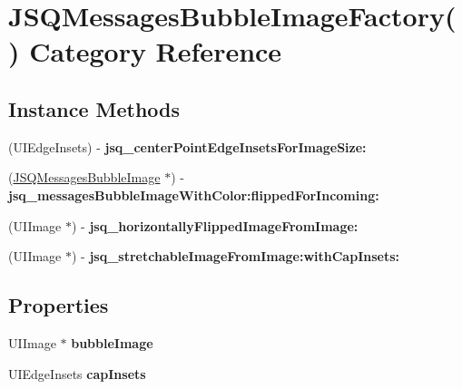 \hypertarget{category_j_s_q_messages_bubble_image_factory_07_08}{}\section{J\+S\+Q\+Messages\+Bubble\+Image\+Factory() Category Reference}
\label{category_j_s_q_messages_bubble_image_factory_07_08}
\subsection*{Instance Methods}
\begin{DoxyCompactItemize}
\item 
\hypertarget{category_j_s_q_messages_bubble_image_factory_07_08_a84f721f2bf179b8a8b4b1c2728c80634}{}(U\+I\+Edge\+Insets) -\/ {\bfseries jsq\+\_\+center\+Point\+Edge\+Insets\+For\+Image\+Size\+:}\label{category_j_s_q_messages_bubble_image_factory_07_08_a84f721f2bf179b8a8b4b1c2728c80634}

\item 
\hypertarget{category_j_s_q_messages_bubble_image_factory_07_08_ab347799d6f7e645a49f43f7ea0d47cd8}{}(\hyperlink{interface_j_s_q_messages_bubble_image}{J\+S\+Q\+Messages\+Bubble\+Image} $\ast$) -\/ {\bfseries jsq\+\_\+messages\+Bubble\+Image\+With\+Color\+:flipped\+For\+Incoming\+:}\label{category_j_s_q_messages_bubble_image_factory_07_08_ab347799d6f7e645a49f43f7ea0d47cd8}

\item 
\hypertarget{category_j_s_q_messages_bubble_image_factory_07_08_a5f48c6255831121009c77402f0458ef0}{}(U\+I\+Image $\ast$) -\/ {\bfseries jsq\+\_\+horizontally\+Flipped\+Image\+From\+Image\+:}\label{category_j_s_q_messages_bubble_image_factory_07_08_a5f48c6255831121009c77402f0458ef0}

\item 
\hypertarget{category_j_s_q_messages_bubble_image_factory_07_08_a86326f60be3d933ee24e94eda5e0eb9f}{}(U\+I\+Image $\ast$) -\/ {\bfseries jsq\+\_\+stretchable\+Image\+From\+Image\+:with\+Cap\+Insets\+:}\label{category_j_s_q_messages_bubble_image_factory_07_08_a86326f60be3d933ee24e94eda5e0eb9f}

\end{DoxyCompactItemize}
\subsection*{Properties}
\begin{DoxyCompactItemize}
\item 
\hypertarget{category_j_s_q_messages_bubble_image_factory_07_08_a5b84c4b987d0a645f9e5b5bee3a8277c}{}U\+I\+Image $\ast$ {\bfseries bubble\+Image}\label{category_j_s_q_messages_bubble_image_factory_07_08_a5b84c4b987d0a645f9e5b5bee3a8277c}

\item 
\hypertarget{category_j_s_q_messages_bubble_image_factory_07_08_a0b28ca5be9fd2d17b11d0efbc9e87c28}{}U\+I\+Edge\+Insets {\bfseries cap\+Insets}\label{category_j_s_q_messages_bubble_image_factory_07_08_a0b28ca5be9fd2d17b11d0efbc9e87c28}

\end{DoxyCompactItemize}


